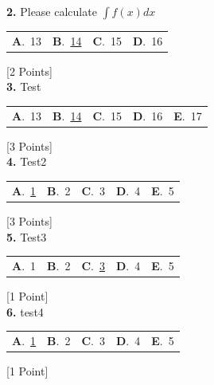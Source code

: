\documentclass[12pt]{article}
\newcommand{\choice}[2]{\textbf{#1}.~#2}
\begin{document}
\noindent \textbf{\textenglish{2.}} {\textenglish{Please calculate }}\(\int f(x)dx\)

\begin{tabularx}{\linewidth}{@{}*{4}{Y}@{}}
\choice{A}{{{\textenglish{13}}}} & \choice{B}{{\underline{{\textenglish{14}}}}} & \choice{C}{{{\textenglish{15}}}} & \choice{D}{{{\textenglish{16}}}} \\
\end{tabularx}
\hfill {\textenglish{[2 Points]}}\\[0.5em]

\noindent \textbf{\textenglish{3.}} {\textenglish{Test}}

\begin{tabularx}{\linewidth}{@{}*{5}{Y}@{}}
\choice{A}{{{\textenglish{13}}}} & \choice{B}{{\underline{{\textenglish{14}}}}} & \choice{C}{{{\textenglish{15}}}} & \choice{D}{{{\textenglish{16}}}} & \choice{E}{{{\textenglish{17}}}} \\
\end{tabularx}
\hfill {\textenglish{[3 Points]}}\\[0.5em]

\noindent \textbf{\textenglish{4.}} {\textenglish{Test2}}

\begin{tabularx}{\linewidth}{@{}*{5}{Y}@{}}
\choice{A}{{\underline{{\textenglish{1}}}}} & \choice{B}{{{\textenglish{2}}}} & \choice{C}{{{\textenglish{3}}}} & \choice{D}{{{\textenglish{4}}}} & \choice{E}{{{\textenglish{5}}}} \\
\end{tabularx}
\hfill {\textenglish{[3 Points]}}\\[0.5em]

\noindent \textbf{\textenglish{5.}} {\textenglish{Test3}}

\begin{tabularx}{\linewidth}{@{}*{5}{Y}@{}}
\choice{A}{{{\textenglish{1}}}} & \choice{B}{{{\textenglish{2}}}} & \choice{C}{{\underline{{\textenglish{3}}}}} & \choice{D}{{{\textenglish{4}}}} & \choice{E}{{{\textenglish{5}}}} \\
\end{tabularx}
\hfill {\textenglish{[1 Point]}}\\[0.5em]

\noindent \textbf{\textenglish{6.}} {\textenglish{test4}}

\begin{tabularx}{\linewidth}{@{}*{5}{Y}@{}}
\choice{A}{{\underline{{\textenglish{1}}}}} & \choice{B}{{{\textenglish{2}}}} & \choice{C}{{{\textenglish{3}}}} & \choice{D}{{{\textenglish{4}}}} & \choice{E}{{{\textenglish{5}}}} \\
\end{tabularx}
\hfill {\textenglish{[1 Point]}}\\[0.5em]
\end{document}
